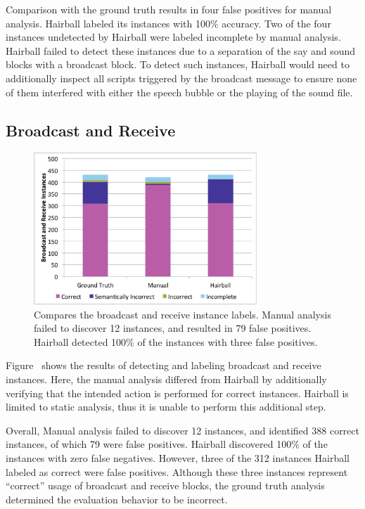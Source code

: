 Comparison with the ground truth results in four false positives for manual
analysis. Hairball labeled its instances with 100\% accuracy. Two of the four
instances undetected by Hairball were labeled incomplete by manual
analysis. Hairball failed to detect these instances due to a separation of the
say and sound blocks with a broadcast block. To detect such instances, Hairball
would need to additionally inspect all scripts triggered by the broadcast
message to ensure none of them interfered with either the speech bubble or the
playing of the sound file.

\subsection{Broadcast and Receive}
\begin{figure}[!t]
\centering \includegraphics[trim=.3in .15in .3in .15in, clip,
  width=3.3in]{graphs/AutoBroadcastReceive.eps}
\caption{Compares the broadcast and receive instance labels. Manual analysis
  failed to discover 12 instances, and resulted in 79 false positives. Hairball
  detected 100\% of the instances with three false positives.}
\end{figure}

Figure~ shows the results of detecting and
labeling broadcast and receive instances. Here, the manual analysis differed
from Hairball by additionally verifying that the intended action is performed
for correct instances. Hairball is limited to static analysis, thus it is
unable to perform this additional step.

Overall, Manual analysis failed to discover 12 instances, and identified 388
correct instances, of which 79 were false positives. Hairball discovered 100\%
of the instances with zero false negatives. However, three of the 312 instances
Hairball labeled as correct were false positives. Although these three
instances represent ``correct'' usage of broadcast and receive blocks, the
ground truth analysis determined the evaluation behavior to be incorrect.



